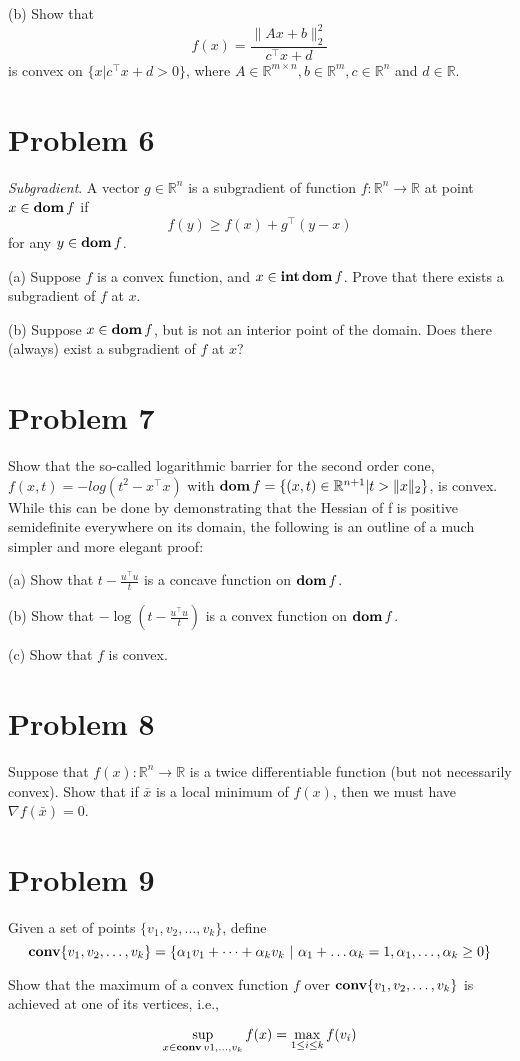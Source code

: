 \documentclass[11pt]{article}
\newcommand{\grad}{\nabla}
\newcommand{\RR}{\mathbb{R}}
\newcommand{\T}{^\top}
\begin{document}
(b) Show that
\[
f(x) = \frac{\|Ax+b\|^2_2}{c\T x+d}
\]
is convex on $\{x|c\T x+d > 0\}$, where $A\in \RR^{m\times n}, b\in \RR^m, c\in\RR^n$ and $d\in \RR$.


\clearpage
\section*{Problem 6}
\textit{Subgradient}. A vector $g\in \RR^n$ is a subgradient of function $f:\RR^n \rightarrow \RR$ at point $x\in\mathop{\textbf{dom}} f$ if
\[
f(y) \geq f(x) + g\T (y-x)
\] 
for any $y\in\mathop{\textbf{dom}} f$.

(a) Suppose $f$ is a convex function, and $x\in\mathop{\textbf{int}}\mathop{\textbf{dom}} f$. Prove that there exists a subgradient of $f$ at $x$.

(b) Suppose $x\in\mathop{\textbf{dom}} f$, but is not an interior point of the domain. Does there (always) exist a subgradient of $f$ at $x$?


\clearpage
\section*{Problem 7}
Show that the so-called logarithmic barrier for the second order cone, $f(x, t) = -log(t^2 - x\T x)$ with $\dom f = \{(x,t) \in \RR^{n+1} | t>\|x\|_2\}$, is convex.
While this can be done by demonstrating that the Hessian of f is positive semidefinite everywhere on its domain, the following is an outline of a much simpler and more elegant proof:

(a) Show that $t-\frac{u\T u}{t}$ is a concave function on $\mathop{\textbf{dom}} f$.

(b) Show that $-\log (t - \frac{u\T u}{t})$ is a convex function on $\mathop{\textbf{dom}} f$.

(c) Show that $f$ is convex.


\clearpage
\section*{Problem 8}
Suppose that $f(x): \RR^n \rightarrow \RR$ is a twice differentiable function (but not necessarily convex). Show that if $\bar x$ is a local minimum of $f(x)$, then we must have $\grad f(\bar x) = 0$.

\clearpage
\section*{Problem 9}
Given a set of points $\{v_1, v_2, \dots, v_k\}$, define
\[
\mathop {\textbf{conv}}\{v_1, v_2, \dots, v_k\} = \{\alpha_1 v_1 + \dots + \alpha_k v_k~|~\alpha_1 + \dots \alpha_k = 1, \alpha_1, \dots, \alpha_k \geq 0\}
\]

Show that the maximum of a convex function $f$ over $\mathop {\textbf{conv}}\{v_1, v_2, \dots, v_k\}$ is achieved at one of its vertices, i.e.,

\[
\sup_{x\in\mathop {\textbf{conv}}{v1, \dots, v_k}} f(x) = \max_{1\leq i \leq k} f(v_i)
\]
\end{document}

